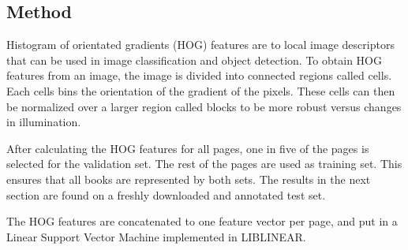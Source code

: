 \subsection{Method}
\label{subsec:pageclasmethod}
Histogram of orientated gradients (HOG) features are
to local image descriptors that can be used in image classification and object
detection\cite{dalal2005histograms}. To obtain HOG features from an image, the
image is divided into connected regions called cells. Each cells bins the
orientation of the gradient of the pixels. These cells can then be normalized
over a larger region called blocks to be more robust versus changes in
illumination.


After calculating the HOG features for all pages, one in five of the pages is
selected for the validation set. The rest of the pages are used as training set.
This ensures that all books are represented by both sets. The results in the
next section are found on a freshly downloaded and annotated test set.

The HOG features are concatenated to one feature vector per page, and put in a
Linear Support Vector Machine\cite{boser1992training} implemented in 
LIBLINEAR\cite{fan2008liblinear}. 

